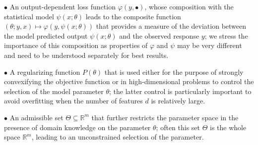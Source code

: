 \documentclass{siamart}
\begin{document}
$\bullet $ An output-dependent loss function $\varphi(y, \bullet)$, whose composition with the statistical model
$\psi(x; \theta)$ leads to the composite function $(\theta;y,x) \mapsto \varphi(y,\psi(x;\theta))$
that provides a measure of the deviation between the model predicted output $\psi(x;\theta)$ and the observed response
$y$; we stress the importance of this composition as properties of $\varphi$ and $\psi$ may be very
different and need to be understood separately for best results.

$\bullet $ A regularizing function $P(\theta)$ that is used either for the purpose of strongly convexifying the
objective function or in high-dimensional problems to control the selection of the model parameter $\theta$;
the latter control is particularly important to avoid overfitting when the number of features $d$ is
relatively large.

$\bullet $ An admissible set $\Theta \subseteq \mathbb{R}^m$ that further restricts the parameter space in the presence of domain knowledge on the parameter $\theta$; often this set $\Theta$ is the whole space $\mathbb{R}^m$, leading to an unconstrained selection of the parameter.
\end{document}
